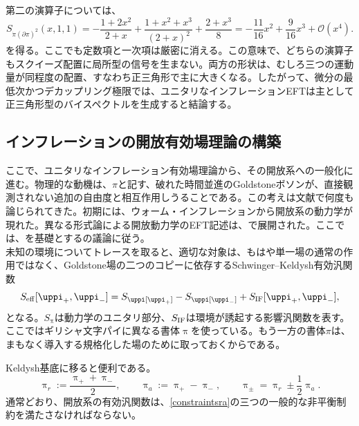 \documentclass[a4paper,11pt,oneside]{article}
\theoremstyle{definition}
\numberwithin{equation}{section}
\begin{document}
第二の演算子については、
\begin{equation}
S_{\dot\pi(\partial\pi)^2}(x,1,1)
=
-\frac{1+2x^2}{2+x}
+\frac{1+x^2+x^3}{(2+x)^2}
+\frac{2+x^3}{8}
=
-\frac{11}{16}x^2
+\frac{9}{16}x^3
+\mathcal O(x^4) .
\end{equation}
を得る。ここでも定数項と一次項は厳密に消える。この意味で、どちらの演算子もスクイーズ配置に局所型の信号を生まない。両方の形状は、むしろ三つの運動量が同程度の配置、すなわち正三角形で主に大きくなる。したがって、微分の最低次かつデカップリング極限では、ユニタリなインフレーションEFTは主として正三角形型のバイスペクトルを生成すると結論する。





\subsection{インフレーションの開放有効場理論の構築}



ここで、ユニタリなインフレーション有効場理論から、その開放系への一般化に進む。物理的な動機は、\(\pi\)と記す、破れた時間並進のGoldstoneボソンが、直接観測されない追加の自由度と相互作用しうることである。この考えは文献で何度も論じられてきた。初期には、ウォーム・インフレーションから開放系の動力学が現れた\cite{Berera:1995ie,Berera:1995wh,Berera:1999ws,Gupta:2002kn,Berera:2008ar,Bastero-Gil:2017yzb}。異なる形式論による開放動力学のEFT記述は、\cite{LopezNacir:2011kk}で展開された。ここでは、\cite{Hongo:2018ant,Hongo:2019qhi,Akyuz:2023lsm,Lau:2024mqm}を基礎とする\cite{Salcedo:2024smn}の議論に従う。\\



未知の環境についてトレースを取ると、適切な対象は、もはや単一場の通常の作用ではなく、Goldstone場の二つのコピーに依存するSchwinger--Keldysh有効汎関数
\begin{equation}
S_{\rm eff}[\uppi_+,\uppi_-]
=
S_\uppi[\uppi_+]-S_\uppi[\uppi_-]+S_{\rm IF}[\uppi_+,\uppi_-] ,
\end{equation}
となる。\(S_\uppi\)は動力学のユニタリ部分、\(S_{\rm IF}\)は環境が誘起する影響汎関数を表す。ここではギリシャ文字パイに異なる書体$  \uppi $を使っている。もう一方の書体$  \pi $は、まもなく導入する規格化した場のために取っておくからである。



Keldysh基底に移ると便利である。
\begin{equation}
\uppi_r:=\frac{\uppi_++\uppi_-}{2},
\qquad
\uppi_a:=\uppi_+-\uppi_-,
\qquad
\uppi_\pm=\uppi_r\pm \frac12 \uppi_a .
\end{equation}
通常どおり、開放系の有効汎関数は、\eqref{constraintsra}の三つの一般的な非平衡制約を満たさなければならない。
\end{document}
